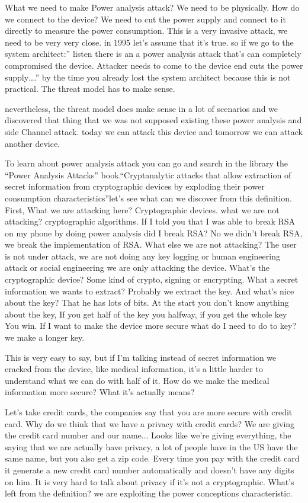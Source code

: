 What we need to make Power analysis attack? We need to be physically. How do we
connect to the device? We need to cut the power supply and connect to it
directly to measure the power consumption. This is a very invasive attack, we
need to be very very close. in 1995 let's assume that it's true. so if we go to
the system architect:” listen there is an a power analysis attack that's can
completely compromised the device. Attacker needs to come to the device end cuts
the power supply….” by the time you already lost the system architect because
this is not practical. The threat model has to make sense.
 
nevertheless, the threat model does make sense in a lot of scenarios and we
discovered that thing that we was not supposed existing these power analysis and
side Channel attack. today we can attack this device and tomorrow we can attack
another device.

To learn about power analysis attack you can go and search in the library the
“Power Analysis Attacks” book.“Cryptanalytic attacks that allow extraction of
secret information from cryptographic devices by exploding their power
consumption characteristics”let's see what can we discover from this definition.
First, What we are attacking here? Cryptographic devices. what we are not
attacking? cryptographic algorithms. If I told you that I was able to break RSA
on my phone by doing power analysis did I break RSA? No we didn't break RSA, we
break the implementation of RSA. What else we are not attacking? The user is not
under attack, we are not doing any key logging or human engineering attack or
social engineering we are only attacking the device. What's the cryptographic
device? Some kind of crypto, signing or encrypting. What a secret information we
wants to extract? Probably we extract the key. And what's nice about the key?
That he has lots of bits. At the start you don't know anything about the key, If
you get half of the key you halfway, if you get the whole key You win. If I want
to make the device more secure what do I need to do to key? we make a longer
key.

This is very easy to say, but if I'm talking instead of secret information we
cracked from the device, like medical information, it's a little harder to
understand what we can do with half of it. How do we make the medical
information more secure? What it's actually means?

Let's take credit cards, the companies say that you are more secure with credit
card. Why do we think that we have a privacy with credit cards? We are giving
the credit card number and our name... Looks like we're giving everything, the
saying that we are actually have privacy, a lot of people have in the US have
the same name, but you also get a zip code. Every time you pay with the credit
card it generate a new credit card number automatically and doesn't have any
digits on him. It is very hard to talk about privacy if it's not a
cryptographic. What's left from the definition? we are exploiting the power
conceptions characteristic.

